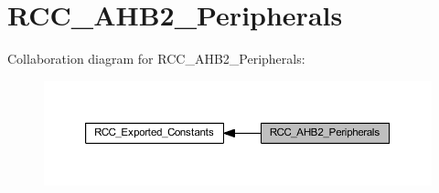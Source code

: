 \hypertarget{group___r_c_c___a_h_b2___peripherals}{}\section{R\+C\+C\+\_\+\+A\+H\+B2\+\_\+\+Peripherals}
\label{group___r_c_c___a_h_b2___peripherals}
Collaboration diagram for R\+C\+C\+\_\+\+A\+H\+B2\+\_\+\+Peripherals\+:
\nopagebreak
\begin{figure}[H]
\begin{center}
\leavevmode
\includegraphics[width=350pt]{group___r_c_c___a_h_b2___peripherals}
\end{center}
\end{figure}
